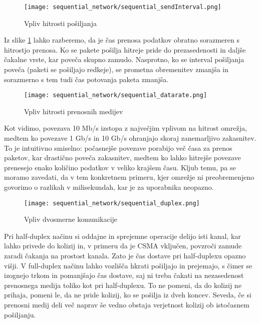 \begin{figure}[H]
    \centering
    \texttt{[image: sequential\_network/sequential\_sendInterval.png]}
    \caption{Vpliv hitrosti pošiljanja}
    \label{g05:fig:sequential-sendInterval}
\end{figure}

Iz slike \ref{g05:fig:sequential-sendInterval} lahko razberemo, da je čas prenosa podatkov obratno sorazmeren s hitrostjo prenosa. Ko se pakete pošilja hitreje pride do prezasedenosti in daljše čakalne vrste, kar poveča skupno zamudo. Nasprotno, ko se interval pošiljanja poveča (paketi se pošiljajo redkeje), se prometna obremenitev zmanjša in sorazmerno s tem tudi čas potovanja paketa zmanjša.

\begin{figure}[H]
    \centering
    \texttt{[image: sequential\_network/sequential\_datarate.png]}
    \caption{Vpliv hitrosti prenosnih medijev}
    \label{g05:fig:sequential-datarate}
\end{figure}

Kot vidimo, povezava 10 Mb/s izstopa z največjim vplivom na hitrost omrežja, medtem ko povezave 1 Gb/s in 10 Gb/s ohranjajo skoraj zanemarljivo zakasnitev. To je intuitivno smiselno: počasnejše povezave porabijo več časa za prenos paketov, kar drastično poveča zakasnitev, medtem ko lahko hitrejše povezave prenesejo enako količino podatkov v veliko krajšem času. Kljub temu, pa se moramo zavedati, da v tem konkretnem primeru, kjer omrežje ni preobremenjeno govorimo o razlikah v milisekundah, kar je za uporabnika neopazno.

\begin{figure}[H]
    \centering
    \texttt{[image: sequential\_network/sequential\_duplex.png]}
    \caption{Vpliv dvosmerne komunikacije}
    \label{g05:fig:sequential-duplexMode}
\end{figure}

Pri half-duplex načinu si oddajne in sprejemne operacije delijo isti kanal, kar lahko privede do kolizij in, v primeru da je CSMA vključen, povzroči zamude zaradi čakanja na prostost kanala. Zato je čas dostave pri half-duplexu opazno višji. V full-duplex načinu lahko vozlišča hkrati pošiljajo in prejemajo, s čimer se izognejo trkom in pomanjšajo čas dostave, saj ni treba čakati na nezasedenost prenosnega medija toliko kot pri half-duplexu. To ne pomeni, da do kolizij ne prihaja, pomeni le, da ne pride kolizij, ko se pošilja iz dveh koncev. Seveda, če si prenosni medij deli več naprav še vedno obstaja verjetnost kolizij ob istočasnem pošiljanju.

